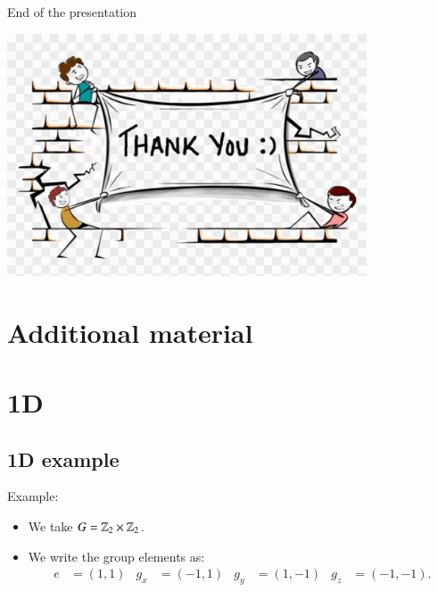 \documentclass{beamer}
\begin{document}
\begin{frame}{End of the presentation}
	\begin{center}
		\includegraphics[width=0.8\textwidth]{Figures/thank-you.png}
	\end{center}
\end{frame}

\section{Additional material}
\section{1D}
\subsection{1D example}

\begin{frame}{Example:}
	\begin{itemize}
		\item We take $G=\mathbb{Z}_2\times\mathbb{Z}_2$.
		\item We write the group elements as:
		\begin{align*}
			e&=(1,1)&g_x&=(-1,1)&g_y&=(1,-1)&g_z&=(-1,-1).
		\end{align*}
	\end{itemize}
	
\end{frame}
\end{document}
